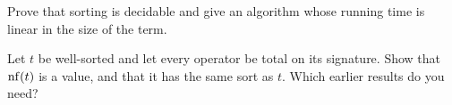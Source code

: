 \begin{exercise}
Prove that sorting is decidable and give an algorithm whose running time is linear in the size of the term.
\end{exercise}

\begin{exercise}
Let $t$ be well-sorted and let every operator be total on its signature. Show that $\operatorname{nf}(t)$ is a value, and that it has the same sort as $t$. Which earlier results do you need?
\end{exercise}
